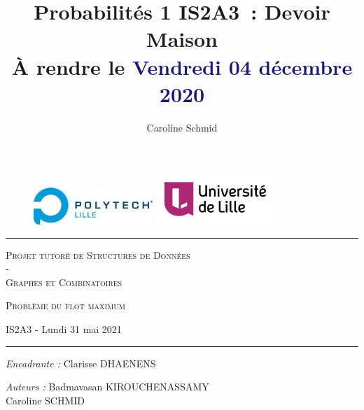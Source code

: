 \documentclass[11pt, a4paper]{report}
\author{\textcolor{Periwinkle}{Caroline Schmid}}
\date{}
\title{Probabilités 1 IS2A3 : Devoir Maison\\À rendre le \textcolor{MidnightBlue}{Vendredi 04 décembre 2020}}
\begin{document}
	\maketitle
	\begin{titlepage}
		\begin{center}
			
			\vspace*{1cm}
			
			\begin{figure}[h]
				\centering
				\includegraphics[width=0.4\textwidth]{images/LOGO_Polytech-lille.jpg}
				\hspace{2cm}
				\includegraphics[width=0.4\textwidth]{images/logo_ulille_transparent.png}
			\end{figure}
			
			\vspace*{2cm}
			
			\rule{1\textwidth}{.8pt}
			
			\LARGE{\textsc{Projet tutoré de Structures de Données \\-\\ Graphes et Combinatoires}}
			
			\vspace*{1cm}
			
			\LARGE{\textsc{Problème du flot maximum}}
			\vspace*{1cm}
			
			\small{IS2A3 - Lundi 31 mai 2021}
			
			\vspace*{0.5cm}
			\rule{1\textwidth}{.10pt}
		
			\vspace*{2.352cm}
			
			\large{\textit{Encadrante :} Clarisse DHAENENS}
			
			\vspace*{0.1cm}	        
			
			\large{\textit{Auteurs :} \textcolor{EnincerExercice}{Badmavasan KIROUCHENASSAMY\\Caroline SCHMID}}
			
			
			
			
		\end{center}
		
	\end{titlepage}
	
\end{document}
